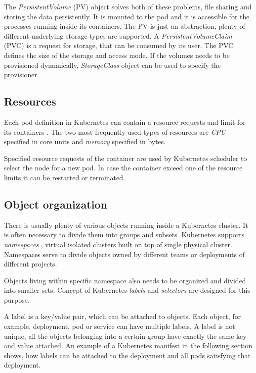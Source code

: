 \documentclass[
  digital, %
  twoside, %
  table,   %
  nolof,   %
  nolot,   %
]{fithesis3}
\begin{document}
The \textit{PersistentVolume} (PV) object solves both of these problems, file sharing and storing the data persistently. It is mounted to the pod and it is accessible for the processes running inside its containers. The PV is just an abstraction, plenty of different underlying storage types are supported. A \textit{PersistentVolumeClaim} (PVC) is a request for storage, that can be consumed by its user. The PVC defines the size of the storage and access mode. If the volumes needs to be provisioned dynamically, \textit{StorageClass} \cite{storage-classes} object can be used to specify the provisioner.

\subsection{Resources} \label{sec:resources}
Each pod definition in Kubernetes can contain a resource requests and limit for its containers \cite{mcrc}. The two most frequently used types of resources are \textit{CPU} specified in core units and \textit{memory} specified in bytes.

Specified resource requests of the container are used by Kubernetes scheduler to select the node for a new pod. In case the container exceed one of the resource limits it can be restarted or terminated.

\subsection{Object organization} \label{sec:obj_organization}
There is usually plenty of various objects running inside a Kubernetes cluster. It is often necessary to divide them into groups and subsets. Kubernetes supports \textit{namespaces} \cite{namespaces}, virtual isolated clusters built on top of single physical cluster. Namespaces serve to divide objects owned by different teams or deployments of different projects.

Objects living within specific namespace also needs to be organized and divided into smaller sets. Concept of Kubernetes \textit{labels} and \textit{selectors} \cite{labels_selectors} are designed for this purpose.

A label is a key/value pair, which can be attached to objects. Each object, for example, deployment, pod or service can have multiple labels. A label is not unique, all the objects belonging into a certain group have exactly the same key and value attached. An example of a Kubernetes manifest in the following section shows, how labels can be attached to the deployment and all pods satisfying that deployment.
\end{document}
